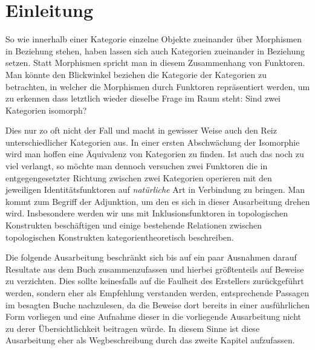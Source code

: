 \section*{Einleitung}

So wie innerhalb einer Kategorie einzelne Objekte zueinander über Morphismen in Beziehung stehen, haben lassen sich auch Kategorien zueinander in Beziehung setzen. Statt Morphismen spricht man in diesem Zusammenhang von Funktoren. Man könnte den Blickwinkel beziehen die Kategorie der Kategorien zu betrachten, in welcher die Morphismen durch Funktoren repräsentiert werden, um zu erkennen dass letztlich wieder dieselbe Frage im Raum steht: Sind zwei Kategorien isomorph? 

Dies nur zo oft nicht der Fall und macht in gewisser Weise auch den Reiz unterschiedlicher Kategorien aus. In einer ersten Abschwächung der Isomorphie wird man hoffen eine Äquivalenz von Kategorien zu finden. Ist auch das noch zu viel verlangt, so möchte man dennoch versuchen zwei Funktoren die in entgegengesetzter Richtung zwischen zwei Kategorien operieren mit den jeweiligen Identitätsfunktoren auf \emph{natürliche} Art in Verbindung zu bringen. Man kommt zum Begriff der Adjunktion, um den es sich in dieser Ausarbeitung drehen wird. Insbesondere werden wir uns mit Inklusionsfunktoren in topologischen Konstrukten beschäftigen und einige bestehende Relationen zwischen topologischen Konstrukten kategorientheoretisch beschreiben.

Die folgende Ausarbeitung beschränkt sich bis auf ein paar Ausnahmen darauf Resultate aus dem Buch \cite{preuss} zusammenzufassen und hierbei größtenteils auf Beweise zu verzichten. 
Dies sollte keinesfalls auf die Faulheit des Erstellers zurückgeführt werden, sondern eher als Empfehlung verstanden werden, entsprechende Passagen im besagten Buche nachzulesen, da die Beweise dort bereits in einer ausführlichen Form vorliegen und eine Aufnahme dieser in die vorliegende Ausarbeitung nicht zu derer Übersichtlichkeit beitragen würde.
In diesem Sinne ist diese Ausarbeitung eher als Wegbeschreibung durch das zweite Kapitel aufzufassen.
